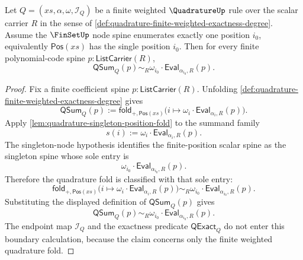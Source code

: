 \begin{theorem}
\label{thm:quadrature-singleton-node-sum-weighted-evaluation}
Let $Q=(xs,\alpha,\omega,\mathcal I_Q)$ be a finite weighted $\QuadratureUp$ rule over the scalar carrier $R$ in the sense of \autoref{def:quadrature-finite-weighted-exactness-degree}. Assume the $\FinSetUp$ node spine enumerates exactly one position $i_0$, equivalently $\mathsf{Pos}(xs)$ has the single position $i_0$. Then for every finite polynomial-code spine $p:\mathsf{ListCarrier}(R)$,
$$
\mathsf{QSum}_Q(p)\sim_R \omega_{i_0}\cdot\mathsf{Eval}_{\alpha_{i_0},R}(p).
$$
\end{theorem}
\begin{proof}
Fix a finite coefficient spine $p:\mathsf{ListCarrier}(R)$. Unfolding \autoref{def:quadrature-finite-weighted-exactness-degree} gives
$$
\mathsf{QSum}_Q(p):=
\mathsf{fold}_{+,\mathsf{Pos}(xs)}
\bigl(i\mapsto \omega_i\cdot\mathsf{Eval}_{\alpha_i,R}(p)\bigr).
$$
Apply \autoref{lem:quadrature-singleton-position-fold} to the summand family
$$
s(i):=\omega_i\cdot\mathsf{Eval}_{\alpha_i,R}(p).
$$
The singleton-node hypothesis identifies the finite-position scalar spine as the singleton spine whose sole entry is
$$
\omega_{i_0}\cdot\mathsf{Eval}_{\alpha_{i_0},R}(p).
$$
Therefore the quadrature fold is classified with that sole entry:
$$
\mathsf{fold}_{+,\mathsf{Pos}(xs)}
\bigl(i\mapsto \omega_i\cdot\mathsf{Eval}_{\alpha_i,R}(p)\bigr)
\sim_R
\omega_{i_0}\cdot\mathsf{Eval}_{\alpha_{i_0},R}(p).
$$
Substituting the displayed definition of $\mathsf{QSum}_Q(p)$ gives
$$
\mathsf{QSum}_Q(p)\sim_R \omega_{i_0}\cdot\mathsf{Eval}_{\alpha_{i_0},R}(p).
$$
The endpoint map $\mathcal I_Q$ and the exactness predicate $\mathsf{QExact}_Q$ do not enter this boundary calculation, because the claim concerns only the finite weighted quadrature fold.
\end{proof}

